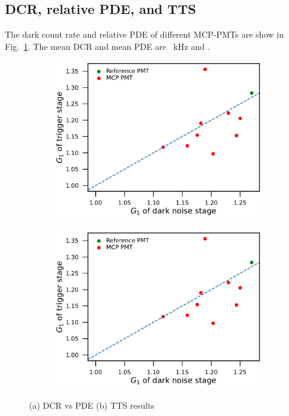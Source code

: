 \subsection{DCR, relative PDE, and TTS}
The dark count rate and relative PDE of different MCP-PMTs are show in Fig.~\ref{fig:DCRCompare}. The mean DCR and mean PDE are \SI{}{kHz} and .
\begin{figure}[!htbp]
    \centering
    \begin{subfigure}[b]{0.49\textwidth}
        \includegraphics[width=\textwidth,page=9]{figures/result/compare.pdf}
        \caption{}
        \label{fig:DCRCompare}
    \end{subfigure}
    \begin{subfigure}[b]{0.49\textwidth}
        \includegraphics[width=\textwidth,page=10]{figures/result/compare.pdf}
        \caption{}
        \label{fig:TTSCompare}
    \end{subfigure}
    \caption{(a) DCR vs PDE (b) TTS results}
\end{figure}

